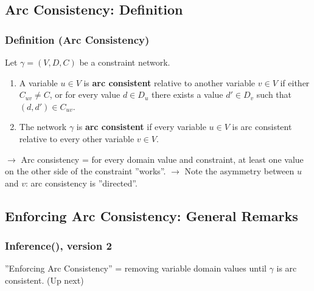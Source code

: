 \documentclass[conference]{styles/acmsiggraph}
\begin{document}
    
    \subsection{Arc Consistency: Definition}
        \subsubsection{Definition (Arc Consistency)}
            Let $\gamma = (V,D,C)$ be a constraint network.
            \begin{enumerate}
                \item A variable $u \in V$ is \textbf{arc consistent} relative to another variable $v \in V$ if either $C_{uv} \neq C$, or for every value $d \in D_u$ there exists a value $d' \in D_v$ such that $(d,d') \in C_{uv}$.
                \item The network $\gamma$ is \textbf{arc consistent} if every variable $u \in V$ is arc consistent relative to every other variable $v \in V$.
            \end{enumerate}
            
            $\rightarrow$ Arc consistency = for every domain value and constraint, at least one value on the other side of the constraint ''works''.\newline
            $\rightarrow$ Note the asymmetry between $u$ and $v$: arc consistency is ''directed''.
        
    \subsection{Enforcing Arc Consistency: General Remarks}
        \subsubsection{Inference(), version 2}
            ''Enforcing Arc Consistency'' = removing variable domain values until $\gamma$ is arc consistent. (Up next)
        
\end{document}
